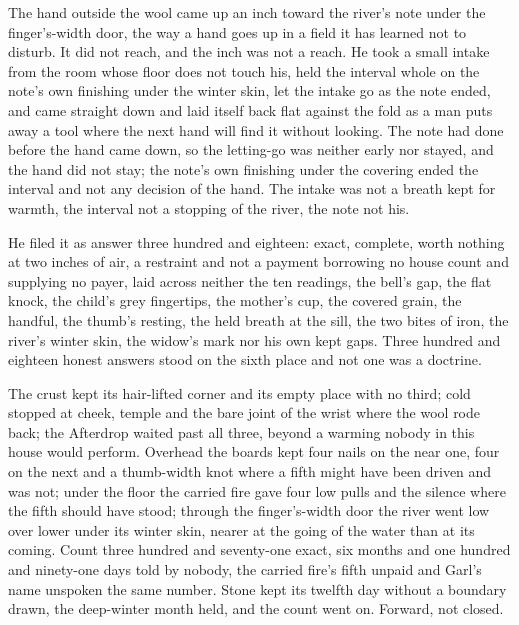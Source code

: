 \scenebreak

The hand outside the wool came up an inch toward the river's note under the finger's-width door, the way a hand goes up in a field it has learned not to disturb. It did not reach, and the inch was not a reach. He took a small intake from the room whose floor does not touch his, held the interval whole on the note's own finishing under the winter skin, let the intake go as the note ended, and came straight down and laid itself back flat against the fold as a man puts away a tool where the next hand will find it without looking. The note had done before the hand came down, so the letting-go was neither early nor stayed, and the hand did not stay; the note's own finishing under the covering ended the interval and not any decision of the hand. The intake was not a breath kept for warmth, the interval not a stopping of the river, the note not his.

He filed it as answer three hundred and eighteen: exact, complete, worth nothing at two inches of air, a restraint and not a payment borrowing no house count and supplying no payer, laid across neither the ten readings, the bell's gap, the flat knock, the child's grey fingertips, the mother's cup, the covered grain, the handful, the thumb's resting, the held breath at the sill, the two bites of iron, the river's winter skin, the widow's mark nor his own kept gaps. Three hundred and eighteen honest answers stood on the sixth place and not one was a doctrine.

The crust kept its hair-lifted corner and its empty place with no third; cold stopped at cheek, temple and the bare joint of the wrist where the wool rode back; the Afterdrop waited past all three, beyond a warming nobody in this house would perform. Overhead the boards kept four nails on the near one, four on the next and a thumb-width knot where a fifth might have been driven and was not; under the floor the carried fire gave four low pulls and the silence where the fifth should have stood; through the finger's-width door the river went low over lower under its winter skin, nearer at the going of the water than at its coming. Count three hundred and seventy-one exact, six months and one hundred and ninety-one days told by nobody, the carried fire's fifth unpaid and Garl's name unspoken the same number. Stone kept its twelfth day without a boundary drawn, the deep-winter month held, and the count went on. Forward, not closed.
